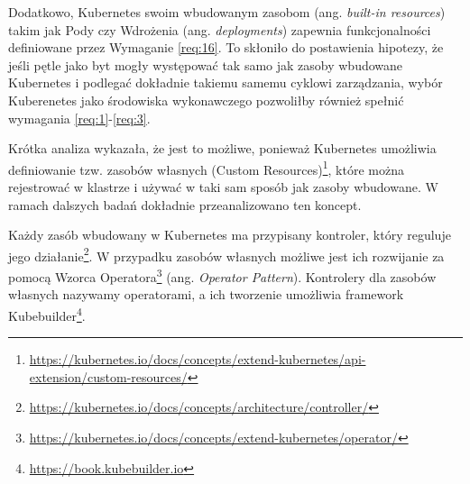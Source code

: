 Dodatkowo, Kubernetes swoim wbudowanym zasobom (ang. \textit{built-in resources}) takim jak Pody czy Wdrożenia (ang. \textit{deployments}) zapewnia funkcjonalności definiowane przez Wymaganie \ref{req:16}. To skłoniło do postawienia hipotezy, że jeśli pętle jako byt mogły występować tak samo jak zasoby wbudowane Kubernetes i podlegać dokładnie takiemu samemu cyklowi zarządzania, wybór Kuberenetes  jako środowiska wykonawczego pozwoliłby również spełnić wymagania \ref{req:1}-\ref{req:3}. 

Krótka analiza wykazała, że jest to możliwe, ponieważ Kubernetes umożliwia definiowanie tzw. zasobów własnych (Custom Resources)\footnote{\url{https://kubernetes.io/docs/concepts/extend-kubernetes/api-extension/custom-resources/}}, które można rejestrować w klastrze i używać w taki sam sposób jak zasoby wbudowane. W ramach dalszych badań dokładnie przeanalizowano ten koncept.

Każdy zasób wbudowany w Kubernetes ma przypisany kontroler, który reguluje jego działanie\footnote{\url{https://kubernetes.io/docs/concepts/architecture/controller/}}. W przypadku zasobów własnych możliwe jest ich rozwijanie za pomocą Wzorca Operatora\footnote{\url{https://kubernetes.io/docs/concepts/extend-kubernetes/operator/}} (ang. \textit{Operator Pattern}). Kontrolery dla zasobów własnych nazywamy operatorami, a ich tworzenie umożliwia framework Kubebuilder\footnote{\url{https://book.kubebuilder.io}}.

